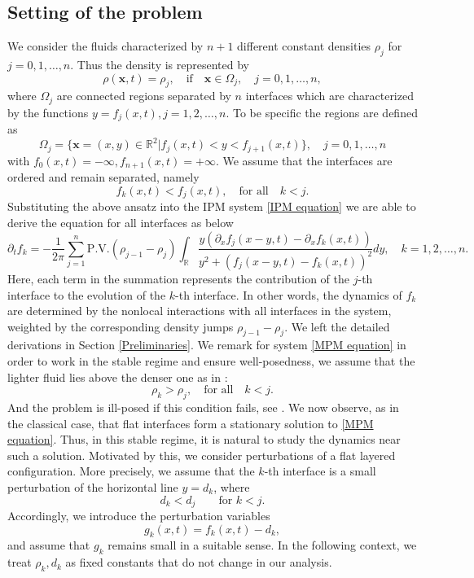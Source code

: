 \documentclass[11pt]{article}
\newcommand{\PV}{\mathrm{P.V.}}
\newcommand{\Om}{\Omega}
\theoremstyle{definition}
\numberwithin{equation}{section}
\begin{document}
\subsection{Setting of the problem}
We consider the fluids characterized by $n+1$ different constant densities $\rho_j$ for $j=0,1,\dots,n$. Thus the density is represented by
\begin{equation}\label{def rho}
    \rho(\textbf{x},t)=\rho_j,\quad \text{if}\quad \textbf{x}\in\Om_j,\quad j=0,1,\dots,n,
\end{equation}
where $\Om_j$ are connected regions separated by $n$ interfaces which are characterized by the functions $y=f_j(x,t),j=1,2,\dots,n$. To be specific the regions are defined as
\begin{equation}
    \Om_j=\{\textbf{x}=(x,y)\in\mathbb{R}^2|f_j(x,t)<y<f_{j+1}(x,t)\},\quad j=0,1,\dots,n
\end{equation}
with $f_0(x,t)=-\infty,f_{n+1}(x,t)=+\infty$. We assume that the interfaces are ordered and remain separated, namely
\begin{equation}
    f_k(x,t)<f_j(x,t),\quad\text{for all}\quad k<j.
\end{equation}
Substituting the above ansatz into the IPM system \eqref{IPM equation} we are able to derive the equation for all interfaces as below
\begin{equation}\label{MPM equation}
    \partial_tf_k=-\frac{1}{2\pi}\sum_{j=1}^n\PV(\rho_{j-1}-\rho_j) \int_{\mathbb{R}}\frac{y\left(\partial_xf_j(x-y,t)-\partial_xf_k(x,t)\right)}{y^2+\left(f_j(x-y,t)-f_k(x,t)\right)^2}dy,\quad k=1,2,\dots,n.
\end{equation}
Here, each term in the summation represents the contribution of the \(j\)-th interface to the evolution of the \(k\)-th interface. In other words, the dynamics of \(f_k\) are determined by the nonlocal interactions with all interfaces in the system, weighted by the corresponding density jumps \(\rho_{j-1}-\rho_j\). We left the detailed derivations in Section \ref{Preliminaries}. 
We remark for system \eqref{MPM equation} in order to work in the stable regime and ensure well-posedness, we assume that the lighter fluid lies above the denser one as in \cite{CordobaContourDynamics}:
\begin{equation}
    \rho_k>\rho_j,\quad \text{for all}\quad k<j.
\end{equation}
And the problem is ill-posed if this condition fails, see \cite{CordobaContourDynamics}. We now observe, as in the classical case, that flat interfaces form a stationary solution to \eqref{MPM equation}. Thus, in this stable regime, it is natural to study the dynamics near such a solution.
Motivated by this, we consider perturbations of a flat layered configuration. More precisely, we assume that the \(k\)-th interface is a small perturbation of the horizontal line \(y=d_k\), where
\[
d_k<d_j \qquad \text{for } k<j.
\]
Accordingly, we introduce the perturbation variables
\begin{equation}\label{def g}
    g_k(x,t)=f_k(x,t)-d_k,
\end{equation}
and assume that \(g_k\) remains small in a suitable sense. In the following context, we treat $\rho_k,d_k$ as fixed constants that do not change in our analysis.
\end{document}
